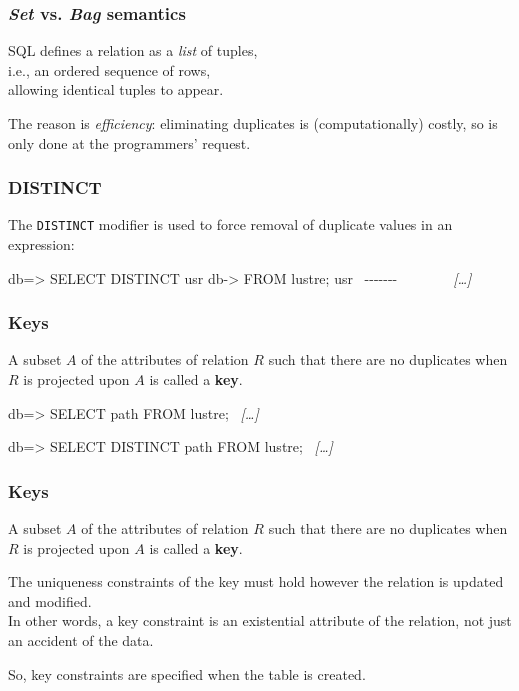 \documentclass[english,serif,mathserif]{beamer}
\begin{document}
\begin{frame}[fragile]
  \frametitle{\emph{Set} vs. \emph{Bag} semantics}

  SQL defines a relation as a \emph{list} of tuples, \\ i.e., an
  ordered sequence of rows, \\ allowing identical tuples to appear.

  \+ The reason is \emph{efficiency}: eliminating duplicates is
  (computationally) costly, so is only done at the programmers' request.
\end{frame}


\begin{frame}[fragile]
  \frametitle{DISTINCT}

  The \texttt{DISTINCT} modifier is used to force removal of duplicate values in
  an expression:

  \+
\begin{sql}[basicstyle=\ttfamily\tiny]
db=> SELECT DISTINCT usr
db-> FROM lustre;
  usr
~-{}-{}-{}-{}-{}-{}-{}~
 ~~
 ~~
 ~{\em [\ldots]}~
\end{sql}
\end{frame}


\begin{frame}[fragile]
  \frametitle{Keys}

  A subset $A$ of the attributes of relation $R$ such that there are no
  duplicates when $R$ is projected upon $A$ is called a \textbf{key}.

\begin{sql}
db=> SELECT path FROM lustre;
 ~{\em [\ldots]}~
~~

db=> SELECT DISTINCT path FROM lustre;
 ~{\em [\ldots]}~
~~
\end{sql}

\end{frame}

\begin{frame}
  \frametitle{Keys}

  A subset $A$ of the attributes of relation $R$ such that there are no
  duplicates when $R$ is projected upon $A$ is called a \textbf{key}.

  \+
  \alert{The uniqueness constraints of the key must hold however the
  relation is updated and modified.}  \\ In other words, a key constraint
  is an existential attribute of the relation, not just an accident of
  the data.

  \+
  So, key constraints are specified when the table is created.
\end{frame}
\end{document}

